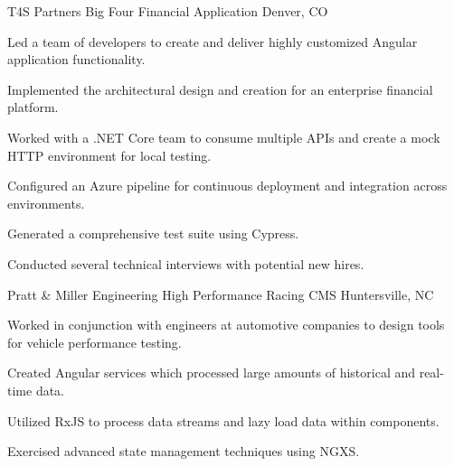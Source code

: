 

\begin{cventries}

    \cventry
    {T4S Partners} %
    {Big Four Financial Application} %
    {Denver, CO} %
    {} %
    {
    \begin{cvitems} %
        \item {Led a team of developers to create and deliver highly customized Angular application functionality.}
        \item {Implemented the architectural design and creation for an enterprise financial platform.}
        \item {Worked with a .NET Core team to consume multiple APIs and create a mock HTTP environment for local testing.}
        \item {Configured an Azure pipeline for continuous deployment and integration across environments.}
        \item {Generated a comprehensive test suite using Cypress.}
        \item {Conducted several technical interviews with potential new hires.}
    \end{cvitems}
    }

    \cventry
    {Pratt \& Miller Engineering} %
    {High Performance Racing CMS} %
    {Huntersville, NC} %
    {} %
    {
    \begin{cvitems} %
        \item {Worked in conjunction with engineers at automotive companies to design tools for vehicle performance testing.}
        \item {Created Angular services which processed large amounts of historical and real-time data.}
        \item {Utilized RxJS to process data streams and lazy load data within components.}
        \item {Exercised advanced state management techniques using NGXS.}
    \end{cvitems}
    }


\end{cventries}
